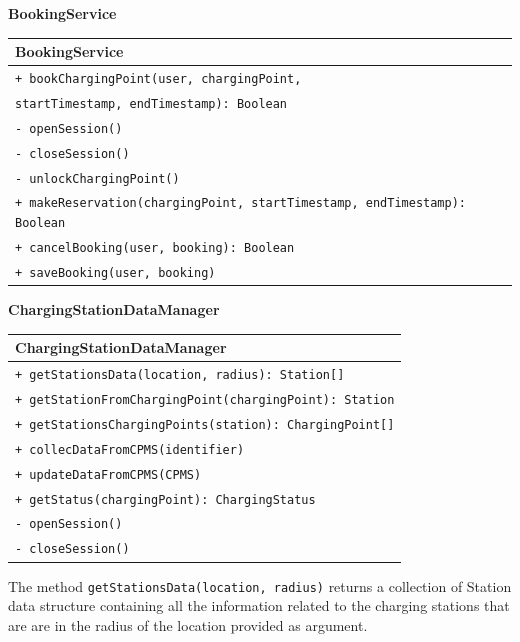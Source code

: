 \textbf{BookingService}\\
\begin{table}[H]
    \centering
    \begin{tabular}{|l|}
        \hline
        \textbf{BookingService} \\
        \hline
        \verb|+ bookChargingPoint(user, chargingPoint,|\\
        \hspace{4.2cm} \verb|startTimestamp, endTimestamp): Boolean|\\
        \verb|- openSession()|\\
        \verb|- closeSession()|\\
        \verb|- unlockChargingPoint()|\\
        \verb|+ makeReservation(chargingPoint, startTimestamp, endTimestamp): Boolean|\\
        \verb|+ cancelBooking(user, booking): Boolean|\\
        \verb|+ saveBooking(user, booking)|\\
        \hline
    \end{tabular}
\end{table}
\pagebreak
\textbf{ChargingStationDataManager}\\
\begin{table}[H]
    \centering
    \begin{tabular}{|l|}
        \hline
        \textbf{ChargingStationDataManager} \\
        \hline
        \verb|+ getStationsData(location, radius): Station[]|\\
        \verb|+ getStationFromChargingPoint(chargingPoint): Station|\\
        \verb|+ getStationsChargingPoints(station): ChargingPoint[]|\\
        \verb|+ collecDataFromCPMS(identifier)|\\
        \verb|+ updateDataFromCPMS(CPMS)|\\
        \verb|+ getStatus(chargingPoint): ChargingStatus|\\
        \verb|- openSession()|\\
        \verb|- closeSession()|\\
        \hline
    \end{tabular}
\end{table}
The method \verb|getStationsData(location, radius)| returns a collection of Station data structure containing all the information related to the charging stations that are are in the radius of the location provided as argument.\\
